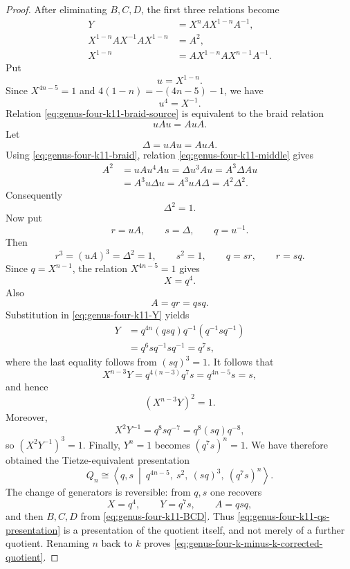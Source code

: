 \documentclass{article}
\begin{document}
\begin{proof}
After eliminating $B,C,D$, the first three relations become
\begin{align}
 Y&=X^nAX^{1-n}A^{-1},
 \label{eq:genus-four-k11-Y}\\
 X^{1-n}AX^{-1}AX^{1-n}&=A^2,
 \label{eq:genus-four-k11-middle}\\
 X^{1-n}&=AX^{1-n}AX^{n-1}A^{-1}.
 \label{eq:genus-four-k11-braid-source}
\end{align}
Put
\[
 u=X^{1-n}.
\]
Since $X^{4n-5}=1$ and
$4(1-n)=-(4n-5)-1$, we have
\[
 u^4=X^{-1}.
\]
Relation \eqref{eq:genus-four-k11-braid-source} is equivalent to the
braid relation
\begin{equation}
\label{eq:genus-four-k11-braid}
 uAu=AuA.
\end{equation}
Let
\[
 \Delta=uAu=AuA.
\]
Using \eqref{eq:genus-four-k11-braid}, relation
\eqref{eq:genus-four-k11-middle} gives
\[
\begin{aligned}
 A^2
 &=uAu^4Au
  =\Delta u^3Au
  =A^3\Delta Au\\
 &=A^3u\Delta u
  =A^3uA\Delta
  =A^2\Delta^2.
\end{aligned}
\]
Consequently
\[
 \Delta^2=1.
\]
Now put
\[
 r=uA,
 \qquad
 s=\Delta,
 \qquad
 q=u^{-1}.
\]
Then
\[
 r^3=(uA)^3=\Delta^2=1,
 \qquad
 s^2=1,
 \qquad
 q=sr,
 \qquad
 r=sq.
\]
Since $q=X^{n-1}$, the relation $X^{4n-5}=1$ gives
\[
 X=q^4.
\]
Also
\[
 A=q r=q s q.
\]
Substitution in \eqref{eq:genus-four-k11-Y} yields
\[
\begin{aligned}
 Y
 &=q^{4n}(qsq)q^{-1}(q^{-1}sq^{-1})\\
 &=q^6sq^{-1}sq^{-1}
  =q^7s,
\end{aligned}
\]
where the last equality follows from $(sq)^3=1$.  It follows that
\[
 X^{n-3}Y=q^{4(n-3)}q^7s=q^{4n-5}s=s,
\]
and hence
\[
 (X^{n-3}Y)^2=1.
\]
Moreover,
\[
 X^2Y^{-1}
 =q^8sq^{-7}
 =q^8(sq)q^{-8},
\]
so $(X^2Y^{-1})^3=1$.  Finally, $Y^n=1$ becomes
$(q^7s)^n=1$.  We have therefore obtained the Tietze-equivalent
presentation
\begin{equation}
\label{eq:genus-four-k11-qs-presentation}
 Q_n\cong
 \left\langle q,s\ \middle|\
 q^{4n-5},\ s^2,\ (sq)^3,\ (q^7s)^n
 \right\rangle .
\end{equation}
The change of generators is reversible: from $q,s$ one recovers
\[
 X=q^4,
 \qquad
 Y=q^7s,
 \qquad
 A=qsq,
\]
and then $B,C,D$ from \eqref{eq:genus-four-k11-BCD}.  Thus
\eqref{eq:genus-four-k11-qs-presentation} is a presentation of the
quotient itself, and not merely of a further quotient.  Renaming $n$
back to $k$ proves \eqref{eq:genus-four-k-minus-k-corrected-quotient}.


\end{proof}
\end{document}
